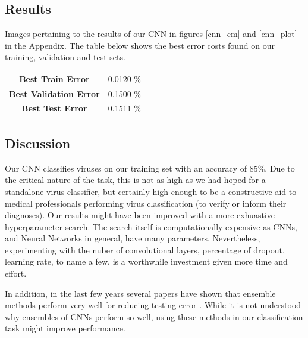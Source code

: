 \begin{multicols}{2}
\subsection{Results}
Images pertaining to the results of our CNN in figures \ref{cnn_cm} and \ref{cnn_plot} in the Appendix. The table below shows the best error costs found on our training, validation and test sets. 

\begin{center}
\begin{tabular}{cc}
\toprule
 \textbf{Best Train Error} 			& 0.0120 \% \\ 
 \textbf{Best Validation Error}     & 0.1500 \% \\  
 \textbf{Best Test Error} 			& 0.1511 \% \\ \bottomrule
\end{tabular}
\end{center}

\subsection{Discussion}
Our CNN classifies viruses on our training set with an accuracy of 85\%. Due to the critical nature of the task, this is not as high as we had hoped for a standalone virus classifier, but certainly high enough to be a constructive aid to medical professionals performing virus classification (to verify or inform their diagnoses). Our results might have been improved with a more exhuastive hyperparameter search. The search itself is computationally expensive as CNNs, and Neural Networks in general, have many parameters. Nevertheless, experimenting with the nuber of convolutional layers, percentage of dropout, learning rate, to name a few, is a worthwhile investment given more time and effort. 

In addition, in the last few years several papers have shown that ensemble methods perform very well for reducing testing error \citet{chenlearning}. While it is not understood why ensembles of CNNs perform so well, using these methods in our classification task might improve performance.



\end{multicols}
